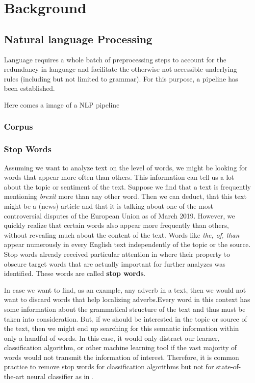 \chapter{Background}


\section{Natural language Processing}
Language requires a whole batch of preprocessing steps to account for the redundancy in language and facilitate the otherwise not accessible underlying rules (including but not limited to grammar). For this purpose, a pipeline has been established.

Here comes a image of a NLP pipeline

\subsection{Corpus}

\subsection{Stop Words}
Assuming we want to analyze text on the level of words, we might be looking for
words that appear more often than others. This information can tell us a lot about the topic or sentiment of the text. Suppose we find that a text is frequently mentioning \textit{brexit} more than any other word. Then we can deduct, that this text might be a (news) article and that it is talking about one of the most controversial disputes of the European Union as of March 2019. However, we quickly realize that certain words also appear more frequently than others, without revealing much about the content of the text. Words like \textit{the, of, than} appear numerously in every English text independently of the topic or the source. Stop words already received particular attention in \citeyear{Luhn1960} where their property to obscure target words that are actually important for further analyzes was identified. These words are called \textbf{stop words}.

In case we want to find, as an example, any adverb in a text, then we would not want to discard words that help localizing adverbs.Every word in this context has some information about the grammatical structure of the text and thus must be taken into consideration. But, if we should be interested in the topic or source of the text, then we might end up searching for this semantic information within only a handful of words. In this case, it would only distract our learner, classification algorithm, or other machine learning tool if the vast majority of words would not transmit the information of interest. Therefore, it is common practice to remove stop words for classification algorithms \citep{McCallum1998, Lodhi2002, Tong2001} but not for state-of-the-art neural classifier as in \citep{Howard2018}.

